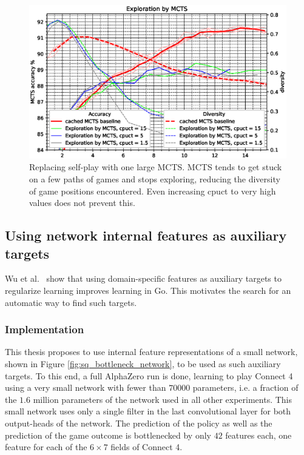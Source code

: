 \documentclass[12pt,onecolumn,oneside,titlepage]{article}
\begin{document}
\begin{figure}[H]
\centering
\includegraphics[clip,width=\columnwidth]{mcts_tree_explore}
\caption{Replacing self-play with one large MCTS. MCTS tends to get stuck on a few paths of games and stops exploring, reducing the diversity of game positions encountered. Even increasing cpuct to very high values
does not prevent this.}
\label{fig:mcts_tree_explore}
\end{figure}


\subsection{Using network internal features as auxiliary targets}

Wu et al.\ \cite{wu2019accelerating} show that using domain-specific features as auxiliary targets to regularize learning improves learning in Go. This motivates the search for an automatic way to find such targets.

\subsubsection{Implementation}

This thesis proposes to use internal feature representations of a small network, shown in Figure \ref{fig:sq_bottleneck_network},
to be used as such auxiliary targets. To this end, a full AlphaZero run is done, learning to play Connect 4 using a very small network with fewer than $70000$ 
parameters, i.e. a fraction of the $1.6$ million parameters of the network used in all other experiments. This small network uses only a single filter in the last convolutional layer for both output-heads of the network. 
The prediction of the policy as well as the prediction of the game outcome 
is bottlenecked by only $42$ features each, one feature for each of the $6 \times 7$ fields of Connect 4.
\end{document}
